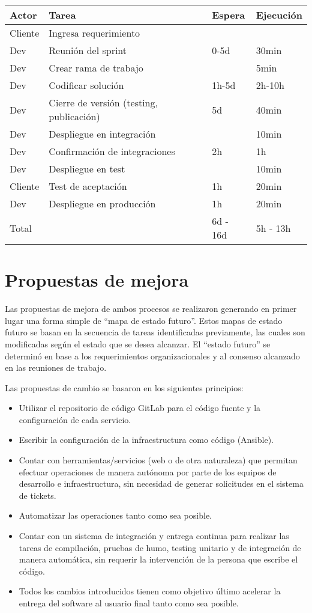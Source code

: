 \begin{tabular}{|l|l|l|l|}
\hline Actor & Tarea & Espera & Ejecución \\ \hline Cliente & Ingresa
requerimiento & & \\ \hline Dev & Reunión del sprint & 0-5d & 30min
\\ \hline Dev & Crear rama de trabajo & & 5min \\ \hline Dev &
Codificar solución & 1h-5d & 2h-10h \\ \hline Dev & Cierre de versión
(testing, publicación) & 5d & 40min \\ \hline Dev & Despliegue en
integración & & 10min \\ \hline Dev & Confirmación de integraciones &
2h & 1h \\ \hline Dev & Despliegue en test & & 10min \\ \hline Cliente
& Test de aceptación & 1h & 20min \\ \hline Dev & Despliegue en
producción & 1h & 20min \\ \hline Total & & 6d - 16d & 5h - 13h
\\ \hline
\end{tabular}

\section{Propuestas de mejora}

Las propuestas de mejora de ambos procesos se realizaron generando en
primer lugar una forma simple de ``mapa de estado futuro''. Estos mapas
de estado futuro se basan en la secuencia de tareas identificadas
previamente, las cuales son modificadas según el estado que se desea
alcanzar. El ``estado futuro'' se determinó en base a los requerimientos
organizacionales y al consenso alcanzado en las reuniones de trabajo.

Las propuestas de cambio se basaron en los siguientes principios:

\begin{itemize}
\item Utilizar el repositorio de código GitLab para el código fuente y
  la configuración de cada servicio.
\item Escribir la configuración de la infraestructura como código
  (Ansible).
\item Contar con herramientas/servicios (web o de otra naturaleza) que
  permitan efectuar operaciones de manera autónoma por parte de los
  equipos de desarrollo e infraestructura, sin necesidad de generar
  solicitudes en el sistema de tickets.
\item Automatizar las operaciones tanto como sea posible.
\item Contar con un sistema de integración y entrega continua para
  realizar las tareas de compilación, pruebas de humo, testing
  unitario y de integración de manera automática, sin requerir la
  intervención de la persona que escribe el código.
\item Todos los cambios introducidos tienen como objetivo último
  acelerar la entrega del software al usuario final tanto como sea
  posible.
\end{itemize}
